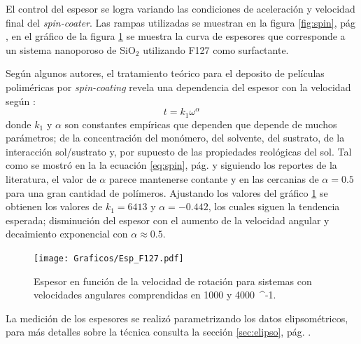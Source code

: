 		El control del espesor se logra variando las condiciones de aceleración y velocidad final del \textit{spin-coater}. Las rampas utilizadas se muestran en la figura \ref{fig:spin}, pág \pageref{fig:spin}, en el gráfico de la figura \ref{fig:esp} se muestra la curva de espesores que corresponde a un sistema nanoporoso de SiO$_2$ utilizando F127 como surfactante. 

		Según algunos autores, el tratamiento teórico para el deposito de películas poliméricas por \textit{spin-coating} revela una dependencia del espesor con la velocidad según \cite{Norrman2005,Meyerhofer1978,Bornside1989,Lora1990}:
						\begin{equation}
			 			    t = k_1 \omega^{\alpha}
			 		    	 \label{eq:spin_meso}
							\end{equation}
		donde $k_1$ y $\alpha$ son constantes empíricas que dependen que depende de muchos parámetros; de la concentración del monómero, del solvente, del sustrato, de la interacción sol/sustrato y, por supuesto de las propiedades reológicas del sol. Tal como se mostró en la la ecuación \ref{eq:spin}, pág. \pageref{eq:spin} y siguiendo los reportes de la literatura, el valor de $\alpha$ parece mantenerse contante y en las cercanias de $\alpha=0.5$ para una gran cantidad de polímeros. Ajustando los valores del gráfico \ref{fig:esp} se obtienen los valores de $k_1=6413$ y  $\alpha=-0.442$, los cuales siguen la tendencia esperada; disminución del espesor con el aumento de la velocidad angular y decaimiento exponencial con $\alpha \approx 0.5$. 
			\begin{figure}[!ht]
						\begin{center}
						\texttt{[image: Graficos/Esp\_F127.pdf]}
						\caption[Espesor en función de la velocidad de rotación.]{Espesor en función de la velocidad de rotación para sistemas \pdmF con velocidades angulares comprendidas en 1000 y \SI{4000}{\min^{-1}.}}
						\label{fig:esp}
						\end{center}
						\end{figure}

		La medición de los espesores se realizó parametrizando los datos elipsométricos, para más detalles sobre la técnica consulta la sección \ref{sec:elipso}, pág. \pageref{sec:elipso}.
		
